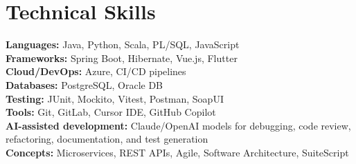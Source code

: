 \section*{Technical Skills}
\textbf{Languages:} Java, Python, Scala, PL/SQL, JavaScript\\
\textbf{Frameworks:} Spring Boot, Hibernate, Vue.js, Flutter\\
\textbf{Cloud/DevOps:} Azure, CI/CD pipelines\\
\textbf{Databases:} PostgreSQL, Oracle DB\\
\textbf{Testing:} JUnit, Mockito, Vitest, Postman, SoapUI\\
\textbf{Tools:} Git, GitLab, Cursor IDE, GitHub Copilot\\
\textbf{AI-assisted development:} Claude/OpenAI models for debugging, code review, refactoring, documentation, and test generation\\
\textbf{Concepts:} Microservices, REST APIs, Agile, Software Architecture, SuiteScript